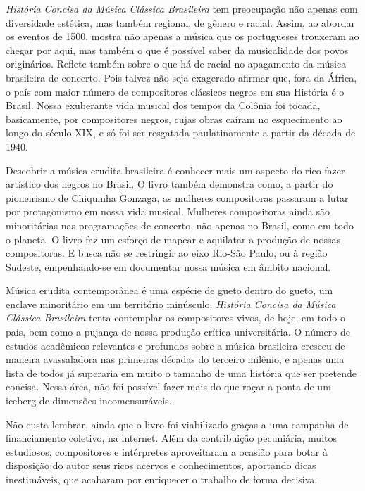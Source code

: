\documentclass[11pt]{extarticle}
\begin{document}
\emph{História Concisa da Música Clássica Brasileira} tem preocupação
não apenas com diversidade estética, mas também regional, de gênero e
racial. Assim, ao abordar os eventos de 1500, mostra não apenas a música
que os portugueses trouxeram ao chegar por aqui, mas também o que é
possível saber da musicalidade dos povos originários. Reflete também
sobre o que há de racial no apagamento da música brasileira de concerto.
Pois talvez não seja exagerado afirmar que, fora da África, o país com
maior número de compositores clássicos negros em sua História é o
Brasil. Nossa exuberante vida musical dos tempos da Colônia foi tocada,
basicamente, por compositores negros, cujas obras caíram no esquecimento
ao longo do século XIX, e só foi ser resgatada paulatinamente a partir
da década de 1940.

Descobrir a música erudita brasileira é conhecer mais um aspecto do rico
fazer artístico dos negros no Brasil. O livro também demonstra como, a
partir do pioneirismo de Chiquinha Gonzaga, as mulheres compositoras
passaram a lutar por protagonismo em nossa vida musical. Mulheres
compositoras ainda são minoritárias nas programações de concerto, não
apenas no Brasil, como em todo o planeta. O livro faz um esforço de
mapear e aquilatar a produção de nossas compositoras. E busca não se
restringir ao eixo Rio-São Paulo, ou à região Sudeste, empenhando-se em
documentar nossa música em âmbito nacional.

Música erudita contemporânea é uma espécie de gueto dentro do gueto, um
enclave minoritário em um território minúsculo. \emph{História Concisa
da Música Clássica Brasileira} tenta contemplar os compositores vivos,
de hoje, em todo o país, bem como a pujança de nossa produção crítica
universitária. O número de estudos acadêmicos relevantes e profundos
sobre a música brasileira cresceu de maneira avassaladora nas primeiras
décadas do terceiro milênio, e apenas uma lista de todos já superaria em
muito o tamanho de uma história que ser pretende concisa. Nessa área,
não foi possível fazer mais do que roçar a ponta de um iceberg de
dimensões incomensuráveis.

Não custa lembrar, ainda que o livro foi viabilizado graças a uma
campanha de financiamento coletivo, na internet. Além da contribuição
pecuniária, muitos estudiosos, compositores e intérpretes aproveitaram a
ocasião para botar à disposição do autor seus ricos acervos e
conhecimentos, aportando dicas inestimáveis, que acabaram por enriquecer
o trabalho de forma decisiva.
\end{document}
